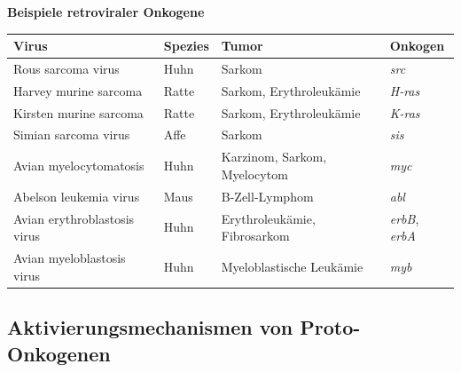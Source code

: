 \begin{bsp}
    \textbf{Beispiele retroviraler Onkogene}
    \begin{mytable}
        \begin{tabular}{|l|l|l|l|}
            \hline
            \textbf{Virus} &
            \textbf{Spezies} &
            \textbf{Tumor} &
            \textbf{Onkogen} \\
            \hline
            Rous sarcoma virus &
            Huhn &
            Sarkom &
            \textit{src} \\

            Harvey murine sarcoma &
            Ratte &
            Sarkom, Erythroleukämie &
            \textit{H-ras} \\

            Kirsten murine sarcoma &
            Ratte &
            Sarkom, Erythroleukämie &
            \textit{K-ras} \\

            Simian sarcoma virus &
            Affe &
            Sarkom &
            \textit{sis} \\

            Avian myelocytomatosis &
            Huhn &
            Karzinom, Sarkom, Myelocytom &
            \textit{myc} \\

            Abelson leukemia virus &
            Maus &
            B-Zell-Lymphom &
            \textit{abl} \\

            Avian erythroblastosis virus &
            Huhn &
            Erythroleukämie, Fibrosarkom &
            \textit{erbB}, \textit{erbA} \\

            Avian myeloblastosis virus &
            Huhn &
            Myeloblastische Leukämie &
            \textit{myb} \\
            \hline
        \end{tabular}
    \end{mytable}

\end{bsp}

\subsection*{Aktivierungsmechanismen von Proto-Onkogenen}\label{subsec:aktivierungsmechanismen-von-proto-onkogenen}

